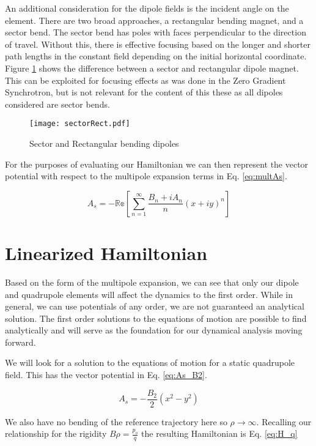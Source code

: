 An additional consideration for the dipole fields is the incident angle on the element. There are two broad approaches, a rectangular bending magnet, and a sector bend. The sector bend has poles with faces perpendicular to the direction of travel. Without this, there is effective focusing based on the longer and shorter path lengths in the constant field depending on the initial horizontal coordinate. Figure \ref{fig:sector} shows the difference between a sector and rectangular dipole magnet. This can be exploited for focusing effects as was done in the Zero Gradient Synchrotron, but is not relevant for the content of this these as all dipoles considered are sector bends.

\begin{figure} \label{fig:sector}
	\centering
	\texttt{[image: sectorRect.pdf]}
	\caption{Sector and Rectangular bending dipoles}
\end{figure}


For the purposes of evaluating our Hamiltonian we can then represent the vector potential with respect to the multipole expansion terms in Eq. \ref{eq:multAs}.

\begin{equation} \label{eq:multAs}
	A_s  =  - \mathbb{Re} \left[ \sum_{n=1}^{\infty} \frac{B_n + i A_n}{n} (x+iy)^n \right]
\end{equation}


\section{Linearized Hamiltonian} \label{sec:linHam}
Based on the form of the multipole expansion, we can see that only our dipole and quadrupole elements will affect the dynamics to the first order. While in general, we can use potentials of any order, we are not guaranteed an analytical solution. The first order solutions to the equations of motion are possible to find analytically and will serve as the foundation for our dynamical analysis moving forward.

We will look for a solution to the equations of motion for a static quadrupole field. This has the vector potential in Eq. \ref{eq:As_B2}.

\begin{equation} \label{eq:As_B2}
	A_s = -\frac{B_2}{2}(x^2 - y^2)
\end{equation}

We also have no bending of the reference trajectory here so $\rho \rightarrow \infty$. Recalling our relationship for the rigidity $B\rho = \frac{p_o}{q}$ the resulting Hamiltonian is Eq. \ref{eq:H_q}

